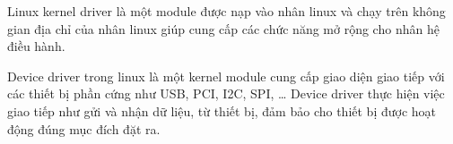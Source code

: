 
Linux kernel driver là một module được nạp vào nhân linux và chạy trên không gian địa chỉ của nhân linux giúp cung cấp các chức năng mở rộng cho nhân hệ điều hành.

Device driver trong linux là một kernel module cung cấp giao diện giao tiếp với các thiết bị phần cứng như USB, PCI, I2C, SPI, … Device driver thực hiện việc giao tiếp như gửi và nhận dữ liệu, từ thiết bị, đảm bảo cho thiết bị được hoạt động đúng mục đích đặt ra. \cite{tutorial}
